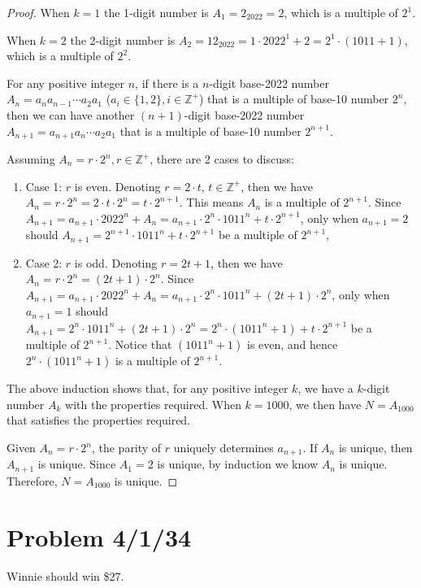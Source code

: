 \documentclass[11pt, oneside]{article}   	%
\begin{document}
\begin{proof}
When $k=1$ the 1-digit number is $A_1=2_{2022} = 2$, which is a multiple of $2^1$. 

When $k=2$ the 2-digit number is $A_2=12_{2022}=1\cdot2022^1+2=2^1\cdot (1011+1)$, which is a multiple of $2^2$.

For any positive integer $n$, if there is a $n$-digit base-2022 number $A_n=a_n a_{n-1} \cdots a_2 a_1$ ($a_i \in \{1, 2\}, i \in \mathbb{Z^+}$) that is a multiple of base-10 number $2^n$, then we can have another $(n+1)$-digit base-2022 number $A_{n+1}=a_{n+1} a_n \cdots a_2 a_1$ that is a multiple of base-10 number $2^{n+1}$.

Assuming $A_n=r\cdot 2^n, r \in \mathbb{Z^+}$, there are 2 cases to discuss: 
\begin{enumerate}
\item Case 1: $r$ is even. Denoting $r=2\cdot t$, $t\in \mathbb{Z^+}$, then we have $A_n=r\cdot 2^n= 2\cdot t\cdot 2^n= t\cdot 2^{n+1}$. This means $A_n$ is a multiple of $2^{n+1}$. Since $A_{n+1}=a_{n+1}\cdot 2022^n+A_n=a_{n+1}\cdot 2^n\cdot 1011^n + t\cdot 2^{n+1}$, only when $a_{n+1}=2$ should $A_{n+1} = 2^{n+1}\cdot 1011^n + t\cdot 2^{n+1}$ be a multiple of $2^{n+1}$, 

\item Case 2: $r$ is odd. Denoting $r=2t+1$, then we have $A_n=r\cdot 2^n=(2t+1)\cdot 2^n $. Since $A_{n+1}=a_{n+1}\cdot 2022^n+A_n=a_{n+1}\cdot 2^n\cdot 1011^n+(2t+1)\cdot2^n$, only when $a_{n+1}=1$ should $A_{n+1}=2^n\cdot 1011^n+(2t+1)\cdot 2^n=2^n\cdot(1011^n+1)+t\cdot 2^{n+1}$ be a multiple of $2^{n+1}$. Notice that $(1011^n+1)$ is even, and hence $2^n\cdot(1011^n+1)$ is a multiple of $2^{n+1}$.
\end{enumerate} 

The above induction shows that, for any positive integer $k$, we have a $k$-digit number $A_k$ with the properties required. When $k=1000$, we then have $N=A_{1000}$ that satisfies the properties required.

Given $A_n=r\cdot 2^n$, the parity of $r$ uniquely determines $a_{n+1}$. If $A_n$ is unique, then $A_{n+1}$ is unique. Since $A_1=2$ is unique, by induction we know $A_n$ is unique. Therefore, $N=A_{1000}$ is unique.

\end{proof}

\newpage
\section{Problem 4/1/34}
Winnie should win \$27. 
\end{document}
